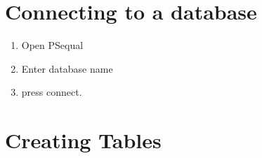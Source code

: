 \documentclass[]{article}
\begin{document}
\section{Connecting to a database}
\begin{enumerate}
	\item Open PSequal 
	\item  Enter database name
	\item press connect.
\end{enumerate}

\section{Creating Tables}
\end{document}
